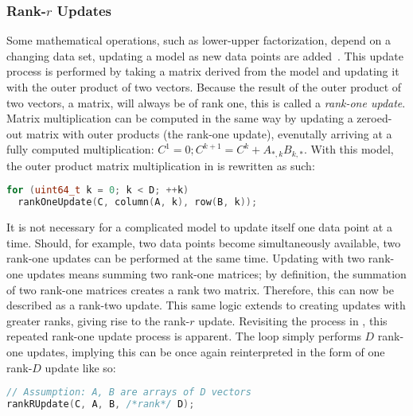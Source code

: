 \documentclass[\main/thesis.tex]{subfiles}
\begin{document}
\subsubsection{Rank-\texorpdfstring{$r$}{r} Updates}
Some mathematical operations, such as lower-upper factorization, depend on a changing data set, updating a model as new data points are added~\autocite{strange2007efficient}.
This update process is performed by taking a matrix derived from the model and updating it with the outer product of two vectors.
Because the result of the outer product of two vectors, a matrix, will always be of rank one\footnotemark, this is called a \emph{rank-one update}.
Matrix multiplication can be computed in the same way by updating a zeroed-out matrix with outer products (the rank-one update), evenutally arriving at a fully computed multiplication: $C^1=0; C^{k+1}=C^k+A_{*,k}B_{k,*}$.
With this model, the outer product matrix multiplication in  is rewritten as such:
\begin{lstlisting}[caption={[Matrix multiplication via rank-one update]Matrix multiplication using rank-one update.},label=lst:rankOne,language=C++,columns=flexible,morekeywords=uint64_t]
for (uint64_t k = 0; k < D; ++k)
  rankOneUpdate(C, column(A, k), row(B, k));
\end{lstlisting}

It is not necessary for a complicated model to update itself one data point at a time.
Should, for example, two data points become simultaneously available, two rank-one updates can be performed at the same time.
Updating with two rank-one updates means summing two rank-one matrices; by definition, the summation of two rank-one matrices creates a rank two matrix\footnotemark.
Therefore, this can now be described as a rank-two update.
This same logic extends to creating updates with greater ranks, giving rise to the rank-$r$ update\footnotemark.
Revisiting the process in , this repeated rank-one update process is apparent.
The loop simply performs $D$ rank-one updates, implying this can be once again reinterpreted in the form of one rank-$D$ update like so:
\begin{lstlisting}[caption={[Matrix multiplication via rank-$r$ update]Matrix multiplication using rank-$r$ update.},label=lst:rankR,language=C++,columns=flexible,morekeywords=uint64_t]
// Assumption: A, B are arrays of D vectors
rankRUpdate(C, A, B, /*rank*/ D);
\end{lstlisting}
\end{document}
